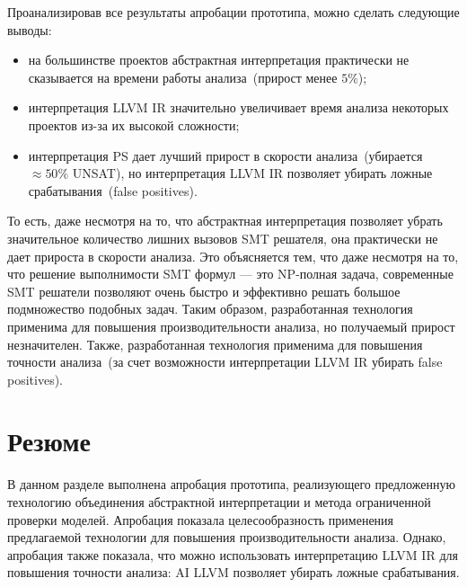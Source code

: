 Проанализировав все результаты апробации прототипа, можно сделать следующие 
выводы:
\begin{itemize}
\item на большинстве проектов абстрактная интерпретация практически не 
сказывается на времени работы анализа~(прирост менее $5\%$);
\item интерпретация LLVM IR значительно увеличивает время анализа некоторых
проектов из-за их высокой сложности;
\item интерпретация PS дает лучший прирост в скорости анализа~(убирается 
$\approx 50\%$ UNSAT), но интерпретация LLVM IR позволяет убирать ложные 
срабатывания~(false positives).
\end{itemize}

То есть, даже несмотря на то, что абстрактная интерпретация позволяет убрать
значительное количество лишних вызовов SMT решателя, она практически не
дает прироста в скорости анализа. Это объясняется тем, что даже несмотря на то, 
что решение выполнимости SMT формул --- это NP-полная задача, современные 
SMT решатели позволяют очень быстро и эффективно решать большое подмножество
подобных задач. Таким образом, разработанная технология применима для
повышения производительности анализа, но получаемый прирост незначителен.
Также, разработанная технология применима для повышения точности анализа~(за 
счет возможности интерпретации LLVM IR убирать false positives).

\section{Резюме}
В данном разделе выполнена апробация прототипа, реализующего предложенную
технологию объединения абстрактной интерпретации и метода ограниченной проверки
моделей. Апробация показала целесообразность применения предлагаемой 
технологии для повышения производительности анализа. Однако, апробация
также показала, что можно использовать интерпретацию LLVM IR для повышения
точности анализа: AI LLVM позволяет убирать ложные срабатывания.